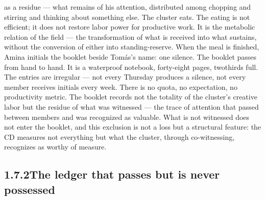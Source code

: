 as a residue — what remains of his attention, distributed among chopping and stirring and thinking about something else. The cluster eats. The eating is not efficient; it does not restore labor power for productive work. It is the metabolic relation of the field — the transformation of what is received into what sustains, without the conversion of either into standing-reserve. When the meal is finished, Amina initials the booklet beside Tomás’s name: one silence. The booklet passes from hand to hand. It is a waterproof notebook, forty-eight pages, twothirds full. The entries are irregular — not every Thursday produces a silence, not every member receives initials every week. There is no quota, no expectation, no productivity metric. The booklet records not the totality of the cluster’s creative labor but the residue of what was witnessed — the trace of attention that passed between members and was recognized as valuable. What is not witnessed does not enter the booklet, and this exclusion is not a loss but a structural feature: the CD measures not everything but what the cluster, through co-witnessing, recognizes as worthy of measure.

\subsection{1.7.2\quad The ledger that passes but is never possessed}

